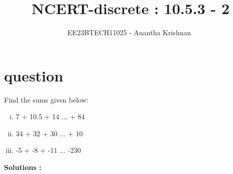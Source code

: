 \documentclass[journal,12pt,onecolumn]{IEEEtran}
\theoremstyle{remark}
\begin{document}

\vspace{3cm}

\title{NCERT-discrete : 10.5.3 - 2}
\author{EE23BTECH11025 - Anantha Krishnan $^{}$%
}
\maketitle
\bigskip



\section{question}
\vspace{0.5cm}
Find the sums given below:
\begin{enumerate}[(i)]
    \item  7 + 10.5 + 14 ... + 84
    \item  34 + 32 + 30 ... + 10
    \item  -5 + -8 + -11 ... -230
\end{enumerate}

 \vspace{0.5cm}



\textbf{Solutions :}
\end{document}

